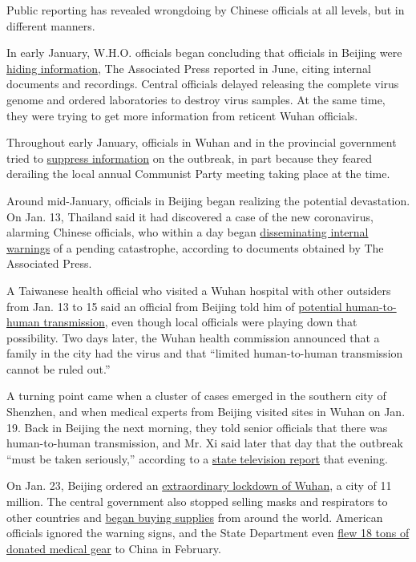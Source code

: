 Public reporting has revealed wrongdoing by Chinese officials at all
levels, but in different manners.

In early January, W.H.O. officials began concluding that officials in
Beijing were
\href{https://apnews.com/3c061794970661042b18d5aeaaed9fae}{hiding
information}, The Associated Press reported in June, citing internal
documents and recordings. Central officials delayed releasing the
complete virus genome and ordered laboratories to destroy virus samples.
At the same time, they were trying to get more information from reticent
Wuhan officials.

Throughout early January, officials in Wuhan and in the provincial
government tried to
\href{https://www.nytimes3xbfgragh.onion/2020/02/01/world/asia/china-coronavirus.html}{suppress
information} on the outbreak, in part because they feared derailing the
local annual Communist Party meeting taking place at the time.

Around mid-January, officials in Beijing began realizing the potential
devastation. On Jan. 13, Thailand said it had discovered a case of the
new coronavirus, alarming Chinese officials, who within a day began
\href{https://apnews.com/68a9e1b91de4ffc166acd6012d82c2f9}{disseminating
internal warnings} of a pending catastrophe, according to documents
obtained by The Associated Press.

A Taiwanese health official who visited a Wuhan hospital with other
outsiders from Jan. 13 to 15 said an official from Beijing told him of
\href{https://www.telegraph.co.uk/news/2020/05/06/taiwanese-official-reveals-china-suspected-human-human-transmission/}{potential
human-to-human transmission}, even though local officials were playing
down that possibility. Two days later, the Wuhan health commission
announced that a family in the city had the virus and that ``limited
human-to-human transmission cannot be ruled out.''

A turning point came when a cluster of cases emerged in the southern
city of Shenzhen, and when medical experts from Beijing visited sites in
Wuhan on Jan. 19. Back in Beijing the next morning, they told senior
officials that there was human-to-human transmission, and Mr. Xi said
later that day that the outbreak ``must be taken seriously,'' according
to a \href{https://apnews.com/3c061794970661042b18d5aeaaed9fae}{state
television report} that evening.

On Jan. 23, Beijing ordered an
\href{https://www.nytimes3xbfgragh.onion/2020/01/22/world/asia/china-coronavirus-travel.html}{extraordinary
lockdown of Wuhan}, a city of 11 million. The central government also
stopped selling masks and respirators to other countries and
\href{https://www.nytimes3xbfgragh.onion/2020/03/13/business/masks-china-coronavirus.html}{began
buying supplies} from around the world. American officials ignored the
warning signs, and the State Department even
\href{https://www.nytimes3xbfgragh.onion/2020/02/19/world/asia/us-china-coronavirus.html}{flew
18 tons of donated medical gear} to China in February.

